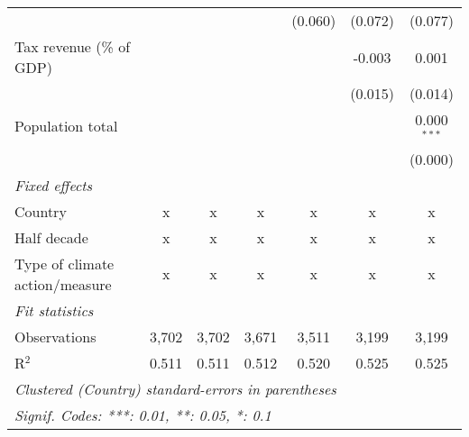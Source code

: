 \begin{tabular}{lcccccc}
                                                           &         &              &               & (0.060)      & (0.072)      & (0.077)\\   
   Tax revenue (\% of GDP)                                 &         &              &               &              & -0.003       & 0.001\\   
                                                           &         &              &               &              & (0.015)      & (0.014)\\   
   Population total                                        &         &              &               &              &              & 0.000$^{***}$\\   
                                                           &         &              &               &              &              & (0.000)\\   
   \emph{Fixed effects}\\
   Country                                                 & x       & x            & x             & x            & x            & x\\  
   Half decade                                             & x       & x            & x             & x            & x            & x\\  
   Type of climate action/measure                          & x       & x            & x             & x            & x            & x\\  
   \midrule \emph{Fit statistics}\\
   Observations                                            & 3,702   & 3,702        & 3,671         & 3,511        & 3,199        & 3,199\\  
   R$^2$                                                   & 0.511   & 0.511        & 0.512         & 0.520        & 0.525        & 0.525\\  
   \midrule
   \multicolumn{7}{l}{\emph{Clustered (Country) standard-errors in parentheses}}\\
   \multicolumn{7}{l}{\emph{Signif. Codes: ***: 0.01, **: 0.05, *: 0.1}}\\
\end{tabular}
\par\endgroup



